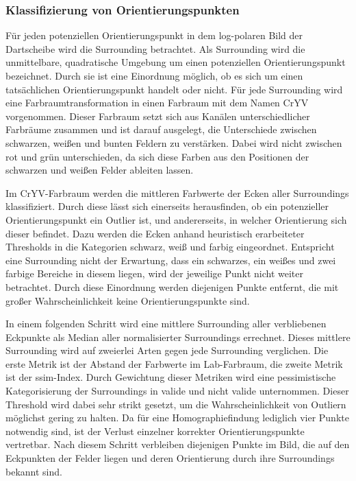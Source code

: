 \subsubsection{Klassifizierung von Orientierungspunkten}
\label{sec:orientierungspunkte_klassifizieren}

Für jeden potenziellen Orientierungspunkt in dem log-polaren Bild der Dartscheibe wird die Surrounding betrachtet. Als Surrounding wird die unmittelbare, quadratische Umgebung um einen potenziellen Orientierungspunkt bezeichnet. Durch sie ist eine Einordnung möglich, ob es sich um einen tatsächlichen Orientierungspunkt handelt oder nicht. Für jede Surrounding wird eine Farbraumtransformation in einen Farbraum mit dem Namen CrYV vorgenommen. Dieser Farbraum setzt sich aus Kanälen unterschiedlicher Farbräume zusammen und ist darauf ausgelegt, die Unterschiede zwischen schwarzen, weißen und bunten Feldern zu verstärken. Dabei wird nicht zwischen rot und grün unterschieden, da sich diese Farben aus den Positionen der schwarzen und weißen Felder ableiten lassen.

Im CrYV-Farbraum werden die mittleren Farbwerte der Ecken aller Surroundings klassifiziert. Durch diese lässt sich einerseits herausfinden, ob ein potenzieller Orientierungspunkt ein Outlier ist, und andererseits, in welcher Orientierung sich dieser befindet. Dazu werden die Ecken anhand heuristisch erarbeiteter Thresholds in die Kategorien schwarz, weiß und farbig eingeordnet. Entspricht eine Surrounding nicht der Erwartung, dass ein schwarzes, ein weißes und zwei farbige Bereiche in diesem liegen, wird der jeweilige Punkt nicht weiter betrachtet. Durch diese Einordnung werden diejenigen Punkte entfernt, die mit großer Wahrscheinlichkeit keine Orientierungspunkte sind.

In einem folgenden Schritt wird eine mittlere Surrounding aller verbliebenen Eckpunkte als Median aller normalisierter Surroundings errechnet. Dieses mittlere Surrounding wird auf zweierlei Arten gegen jede Surrounding verglichen. Die erste Metrik ist der Abstand der Farbwerte im Lab-Farbraum, die zweite Metrik ist der \ac{ssim}-Index. Durch Gewichtung dieser Metriken wird eine pessimistische Kategorisierung der Surroundings in valide und nicht valide unternommen. Dieser Threshold wird dabei sehr strikt gesetzt, um die Wahrscheinlichkeit von Outliern möglichst gering zu halten. Da für eine Homographiefindung lediglich vier Punkte notwendig sind, ist der Verlust einzelner korrekter Orientierungspunkte vertretbar. Nach diesem Schritt verbleiben diejenigen Punkte im Bild, die auf den Eckpunkten der Felder liegen und deren Orientierung durch ihre Surroundings bekannt sind.

